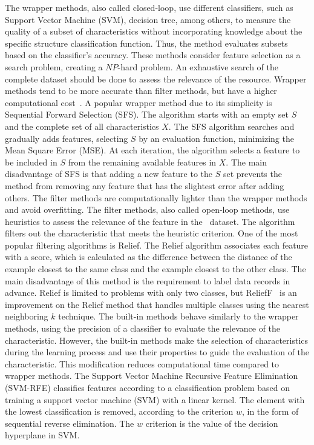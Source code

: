 \documentclass{ieeeaccess}
\begin{document}
The wrapper methods, also called closed-loop, use different classifiers, such as Support Vector Machine (SVM), decision tree, among others, to measure the quality of a subset of characteristics without incorporating knowledge about the specific structure classification function. Thus, the method evaluates subsets based on the classifier's accuracy. These methods consider feature selection as a search problem, creating a $ NP $-hard problem. An exhaustive search of the complete dataset should be done to assess the relevance of the resource. Wrapper methods tend to be more accurate than filter methods, but have a higher computational cost~\cite{AndreoniLopez2019}. A popular wrapper method due to its simplicity is Sequential Forward Selection (SFS). The algorithm starts with an empty set $ S $ and the complete set of all characteristics $ X $. The SFS algorithm searches and gradually adds features, selecting $ S $ by an evaluation function, minimizing the Mean Square Error (MSE). At each iteration, the algorithm selects a feature to be included in $ S $ from the remaining available features in $ X $. The main disadvantage of SFS is that adding a new feature to the $ S $ set prevents the method from removing any feature that has the slightest error after adding others. The filter methods are computationally lighter than the wrapper methods and avoid overfitting. The filter methods, also called open-loop methods, use heuristics to assess the relevance of the feature in the~\cite{survey-features} dataset. The algorithm filters out the characteristic that meets the heuristic criterion. One of the most popular filtering algorithms is Relief. The Relief algorithm associates each feature with a score, which is calculated as the difference between the distance of the example closest to the same class and the example closest to the other class. The main disadvantage of this method is the requirement to label data records in advance. Relief is limited to problems with only two classes, but ReliefF~\cite{relif-comparison} is an improvement on the Relief method that handles multiple classes using the nearest neighboring $ k $ technique. The built-in methods behave similarly to the wrapper methods, using the precision of a classifier to evaluate the relevance of the characteristic. However, the built-in methods make the selection of characteristics during the learning process and use their properties to guide the evaluation of the characteristic. This modification reduces computational time compared to wrapper methods. The Support Vector Machine Recursive Feature Elimination (SVM-RFE) classifies features according to a classification problem based on training a support vector machine (SVM) with a linear kernel. The element with the lowest classification is removed, according to the criterion $ w $, in the form of sequential reverse elimination. The $ w $ criterion is the value of the decision hyperplane in SVM.
\end{document}
